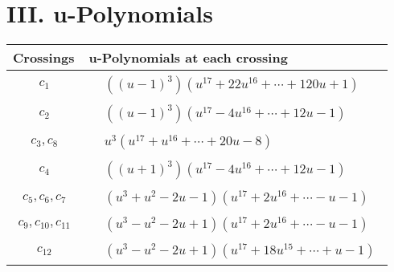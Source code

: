 \documentclass[1p]{elsarticle_modified}
\theoremstyle{definition}
\begin{document}
\newpage\renewcommand{\arraystretch}{1}
\centering \section*{ III. u-Polynomials}
\begin{tabular}{m{50pt}|m{274pt}}
Crossings & \hspace{64pt}u-Polynomials at each crossing \\
\hline $$\begin{aligned}c_{1}\end{aligned}$$&$\begin{aligned}
&((u-1)^3)(u^{17}+22 u^{16}+\cdots+120 u+1)
\end{aligned}$\\
\hline $$\begin{aligned}c_{2}\end{aligned}$$&$\begin{aligned}
&((u-1)^3)(u^{17}-4 u^{16}+\cdots+12 u-1)
\end{aligned}$\\
\hline $$\begin{aligned}c_{3},c_{8}\end{aligned}$$&$\begin{aligned}
&u^3(u^{17}+u^{16}+\cdots+20 u-8)
\end{aligned}$\\
\hline $$\begin{aligned}c_{4}\end{aligned}$$&$\begin{aligned}
&((u+1)^3)(u^{17}-4 u^{16}+\cdots+12 u-1)
\end{aligned}$\\
\hline $$\begin{aligned}c_{5},c_{6},c_{7}\end{aligned}$$&$\begin{aligned}
&(u^3+u^2-2 u-1)(u^{17}+2 u^{16}+\cdots- u-1)
\end{aligned}$\\
\hline $$\begin{aligned}c_{9},c_{10},c_{11}\end{aligned}$$&$\begin{aligned}
&(u^3- u^2-2 u+1)(u^{17}+2 u^{16}+\cdots- u-1)
\end{aligned}$\\
\hline $$\begin{aligned}c_{12}\end{aligned}$$&$\begin{aligned}
&(u^3- u^2-2 u+1)(u^{17}+18 u^{15}+\cdots+u-1)
\end{aligned}$\\
\hline
\end{tabular}\newpage\renewcommand{\arraystretch}{1}
\end{document}
